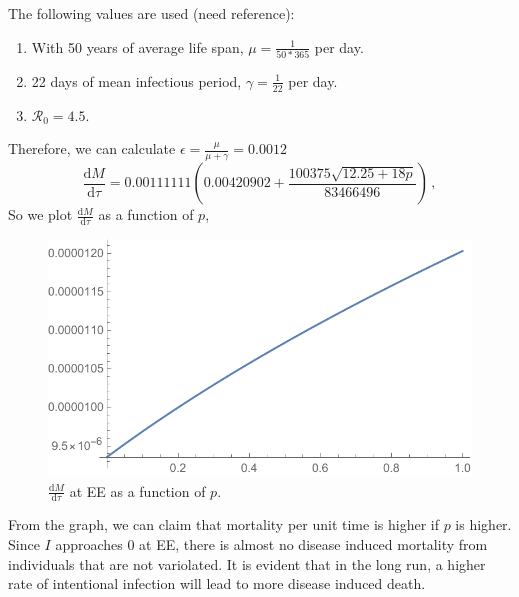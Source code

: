 \documentclass[12pt]{article}
\newcommand\dbyd[2]{\frac{\mathrm d{#1}}{\mathrm d{#2}}}
\newcommand{\R}{\mathcal{R}}
\begin{document}
The following values are used (need reference): 
\begin{enumerate}
\item With 50 years of average life span, $\mu=\frac{1}{50*365}$ per day.
\item 22 days of mean infectious period, $\gamma=\frac{1}{22}$ per day.
\item $\R_0=4.5$.
\end{enumerate}
Therefore, we can calculate $\epsilon=\frac{\mu}{\mu+\gamma}=0.0012$
\begin{equation}
\dbyd{M}{\tau}=0.00111111(0.00420902+\frac{100375\sqrt{12.25+18p}}{83466496})\,,
\end{equation}
So we plot $\dbyd{M}{\tau}$ as a function of $p$,
\begin{figure}[H]
  \centering
  \includegraphics[width=1\textwidth]{Figures/Plot_dmdt_as_f_of_p.pdf}
  \caption{$\dbyd{M}{\tau}$ at EE as a function of $p$.}
\label{fig:dMdt}
\end{figure}
From the graph, we can claim that mortality per unit time is higher if $p$ is higher. Since $I$ approaches 0 at EE, there is almost no disease induced mortality from individuals that are not variolated. It is evident that in the long run, a higher rate of intentional infection will lead to more disease induced death.
\end{document}
